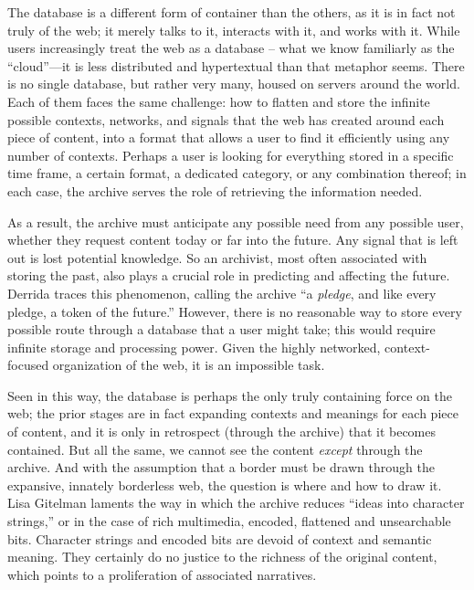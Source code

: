 The database is a different form of container than the others, as it is in fact not truly of the web; it merely talks to it, interacts with it, and works with it. While users increasingly treat the web as a database – what we know familiarly as the ``cloud''---it is less distributed and hypertextual than that metaphor seems. There is no single database, but rather very many, housed on servers around the world. Each of them faces the same challenge: how to flatten and store the infinite possible contexts, networks, and signals that the web has created around each piece of content, into a format that allows a user to find it efficiently using any number of contexts. Perhaps a user is looking for everything stored in a specific time frame, a certain format, a dedicated category, or any combination thereof; in each case, the archive serves the role of retrieving the information needed.

As a result, the archive must anticipate any possible need from any possible user, whether they request content today or far into the future. Any signal that is left out is lost potential knowledge. So an archivist, most often associated with storing the past, also plays a crucial role in predicting and affecting the future. Derrida traces this phenomenon, calling the archive ``a \emph{pledge}, and like every pledge, a token of the future.'' However, there is no reasonable way to store every possible route through a database that a user might take; this would require infinite storage and processing power. Given the highly networked, context-focused organization of the web, it is an impossible task.

Seen in this way, the database is perhaps the only truly containing force on the web; the prior stages are in fact expanding contexts and meanings for each piece of content, and it is only in retrospect (through the archive) that it becomes contained. But all the same, we cannot see the content \emph{except} through the archive. And with the assumption that a border must be drawn through the expansive, innately borderless web, the question is where and how to draw it. Lisa Gitelman laments the way in which the archive reduces ``ideas into character strings,'' or in the case of rich multimedia, encoded, flattened and unsearchable bits.  Character strings and encoded bits are devoid of context and semantic meaning. They certainly do no justice to the richness of the original content, which points to a proliferation of associated narratives.

